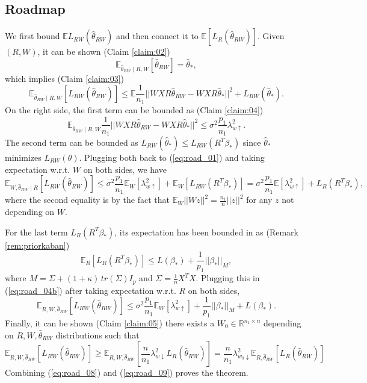 \documentclass[a4paper,fleqn]{cas-sc}
\theoremstyle{plain}
\newcommand{\R}{\mathbb{R}}
\newcommand{\E}{\mathbb{E}}
\newcommand{\be}{\beta}
\newcommand{\te}{\theta}
\newcommand{\hte}{\hat{\theta}}
\begin{document}
\subsection{Roadmap}
\vspace{5pt}

We first bound $\E L_{RW}(\hte_{RW})$ 
and then connect it to $\E [L_{R}(\hte_{RW})]$. Given $(R,W)$, it can be 
shown (Claim \ref{claim:02}) 
\begin{equation}
\E_{\hte_{RW} \mid R,W} 
[\hte_{RW}] = \hte_*, 
\end{equation}
which implies (Claim \ref{claim:03}) 
\begin{equation}
\label{eq:road_01}
\E_{\hte_{RW} \mid R,W} [L_{RW}(\hte_{RW})] \leq \E \frac{1}{n_1}
|| W XR \hte_{RW} - W XR \hte_* ||^2 
+ L_{RW}(\hte_*).
\end{equation}
On the right side, the first term 
can be bounded as (Claim \ref{claim:04}) 
\begin{equation}
\label{eq:road_02}
\E_{\hte_{RW} \mid R,W} 
\frac{1}{n_1} 
|| WXR \hte_{RW} - WXR \hte_* ||^2 
\leq \sigma^2 \frac{p_1}{n_1} 
\lambda_{w \uparrow}^2. 
\end{equation}
The second term can be bounded 
as $L_{RW}(\hte_*) \leq 
L_{RW}(R^T\be_*)$ since 
$\hte_*$ minimizes $L_{RW}(\te)$. 
Plugging both back to 
(\ref{eq:road_01}) and 
taking expectation w.r.t. 
$W$ on both sides, we have 
\begin{equation}
\label{eq:road_04b}
\E_{W, \hte_{RW} \mid R} 
[L_{RW}(\hte_{RW})] 
\leq \sigma^2 \frac{p_1}{n_1} 
\E_W [\lambda_{w \uparrow}^2] 
+ \E_W [L_{RW}(R^T\be_*)] 
= \sigma^2 \frac{p_1}{n_1} 
\E [\lambda_{w \uparrow}^2] 
+ L_{R}(R^T\be_*),  
\end{equation}
where the second equality 
is by the fact that 
$\E_W ||W z||^2 
= \frac{n_1}{n} ||z||^2$ for 
any $z$ not depending on $W$. 

For the last term $L_R(R^T \be_*)$, 
its expectation has been bounded 
in \citep{kaban2014new} as 
(Remark \ref{rem:priorkaban})
\begin{equation}
\E_{R} [L_{R}(R^T\be_*)] 
\leq L(\be_*) + \frac{1}{p_1} 
||\be_*||_M, 
\end{equation}
where $M = \Sigma + (1+\kappa)\, 
tr(\Sigma) I_p$ and 
$\Sigma = \frac{1}{n} X^T X$. 
Plugging this in (\ref{eq:road_04b})
after taking expectation 
w.r.t. $R$ on both sides, 
\begin{equation}
\label{eq:road_08}
\E_{R, W, \hte_{RW}} 
[L_{RW}(\hte_{RW})] 
\leq \sigma^2 \frac{p_1}{n_1} 
\E_W [\lambda_{w \uparrow}^2] 
+ \frac{1}{p_1} ||\be_*||_M 
+ L(\be_*). 
\end{equation}
Finally, it can be shown (Claim \ref{claim:05}) 
there exists a $W_0 \in \R^{n_1 \times 
n}$ depending on $R,W,\hte_{RW}$ 
distributions such that 
\begin{equation}
\label{eq:road_09}
\E_{R, W, \hte_{RW}} 
[L_{RW}(\hte_{RW})] 
\geq \E_{R, W, \hte_{RW}} 
[\frac{n}{n_1} 
\lambda^2_{w \downarrow} 
L_{R}(\hte_{RW}) ] = \frac{n}{n_1} 
\lambda^2_{w_0 \downarrow} 
\E_{R, \hte_{RW}} [L_{R}(\hte_{RW})] 
\end{equation}
Combining (\ref{eq:road_08}) 
and (\ref{eq:road_09}) proves 
the theorem. 
\end{document}
